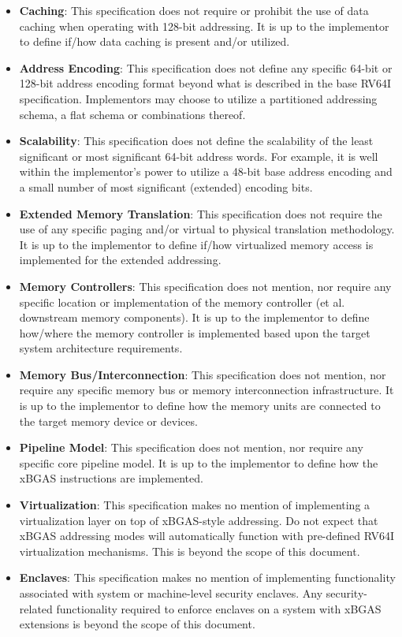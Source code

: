 \documentclass{article}
\begin{document}
\begin{itemize}
\item \textbf{Caching}: This specification does not require or prohibit the use of data caching 
when operating with 128-bit addressing.  It is up to the implementor to define if/how data caching 
is present and/or utilized.  

\item \textbf{Address Encoding}: This specification does not define any specific 64-bit or 128-bit 
address encoding format beyond what is described in the base RV64I specification.  Implementors 
may choose to utilize a partitioned addressing schema, a flat schema or combinations thereof.    

\item \textbf{Scalability}: This specification does not define the scalability of the least significant 
or most significant 64-bit address words.  For example, it is well within the implementor's power to 
utilize a 48-bit base address encoding and a small number of most significant (extended) encoding bits.

\item \textbf{Extended Memory Translation}: This specification does not require the use of any 
specific paging and/or virtual to physical translation methodology.  It is up to the implementor to define 
if/how virtualized memory access is implemented for the extended addressing.

\item \textbf{Memory Controllers}: This specification does not mention, nor require any specific 
location or implementation of the memory controller (et al. downstream memory components).  It is 
up to the implementor to define how/where the memory controller is implemented based upon the 
target system architecture requirements.

\item \textbf{Memory Bus/Interconnection}: This specification does not mention, nor require any 
specific memory bus or memory interconnection infrastructure.  It is up to the implementor to define 
how the memory units are connected to the target memory device or devices.

\item \textbf{Pipeline Model}: This specification does not mention, nor require any specific 
core pipeline model.  It is up to the implementor to define how the xBGAS instructions are 
implemented.

\item \textbf{Virtualization}: This specification makes no mention of implementing a virtualization 
layer on top of xBGAS-style addressing.  Do not expect that xBGAS addressing modes will 
automatically function with pre-defined RV64I virtualization mechanisms.  This is beyond the 
scope of this document.

\item \textbf{Enclaves}: This specification makes no mention of implementing functionality 
associated with system or machine-level security enclaves.  Any security-related functionality 
required to enforce enclaves on a system with xBGAS extensions is beyond the scope 
of this document.

\end{itemize}
\end{document}
